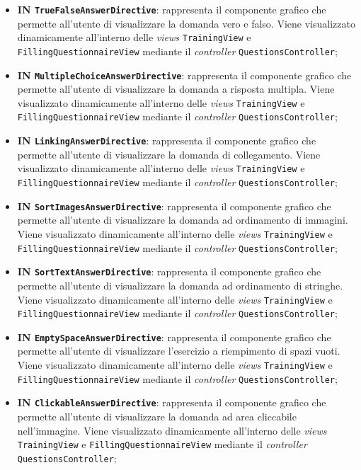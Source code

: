 \begin{itemize}
\begin{itemize}
		\item \textbf{IN \texttt{TrueFalseAnswerDirective}}: rappresenta il componente grafico che permette all'utente di visualizzare la domanda vero e falso. Viene visualizzato dinamicamente all'interno delle \textit{views} \texttt{TrainingView} e \texttt{FillingQuestionnaireView} mediante il \textit{controller} \texttt{QuestionsController};
		\item \textbf{IN \texttt{MultipleChoiceAnswerDirective}}: rappresenta il componente grafico che permette all'utente di visualizzare la domanda a risposta multipla. Viene visualizzato dinamicamente all'interno delle \textit{views} \texttt{TrainingView} e \texttt{FillingQuestionnaireView} mediante il \textit{controller} \texttt{QuestionsController};
		\item \textbf{IN \texttt{LinkingAnswerDirective}}: rappresenta il componente grafico che permette all'utente di visualizzare la domanda di collegamento. Viene visualizzato dinamicamente all'interno delle \textit{views} \texttt{TrainingView} e \texttt{FillingQuestionnaireView} mediante il \textit{controller} \texttt{QuestionsController};
		\item \textbf{IN \texttt{SortImagesAnswerDirective}}: rappresenta il componente grafico che permette all'utente di visualizzare la domanda ad ordinamento di immagini. Viene visualizzato dinamicamente all'interno delle \textit{views} \texttt{TrainingView} e \texttt{FillingQuestionnaireView} mediante il \textit{controller} \texttt{QuestionsController};
		\item \textbf{IN \texttt{SortTextAnswerDirective}}: rappresenta il componente grafico che permette all'utente di visualizzare la domanda ad ordinamento di stringhe. Viene visualizzato dinamicamente all'interno delle \textit{views} \texttt{TrainingView} e \texttt{FillingQuestionnaireView} mediante il \textit{controller} \texttt{QuestionsController};
		\item \textbf{IN \texttt{EmptySpaceAnswerDirective}}: rappresenta il componente grafico che permette all'utente di visualizzare l'esercizio a riempimento di spazi vuoti. Viene visualizzato dinamicamente all'interno delle \textit{views} \texttt{TrainingView} e \texttt{FillingQuestionnaireView} mediante il \textit{controller} \texttt{QuestionsController};
		\item \textbf{IN \texttt{ClickableAnswerDirective}}: rappresenta il componente grafico che permette all'utente di visualizzare la domanda ad area cliccabile nell'immagine. Viene visualizzato dinamicamente all'interno delle \textit{views} \texttt{TrainingView} e \texttt{FillingQuestionnaireView} mediante il \textit{controller} \texttt{QuestionsController};

\end{itemize}
\end{itemize}
